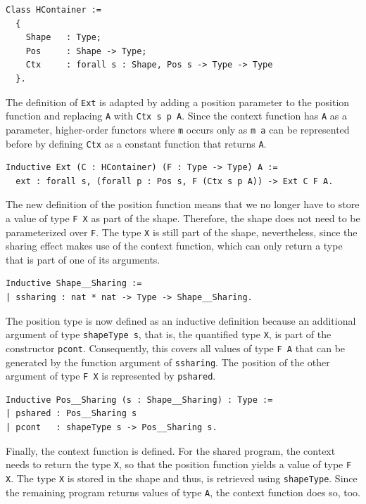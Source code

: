 \documentclass[a4paper, 11pt, fleqn, twoside]{scrreprt}
\newcommand{\hinl}[1]{\texttt{#1}}
\newcommand{\cinl}[1]{\texttt{#1}}
\begin{document}
\begin{verbatim}
Class HContainer :=
  {
    Shape   : Type;
    Pos     : Shape -> Type;
    Ctx     : forall s : Shape, Pos s -> Type -> Type
  }.
\end{verbatim}

The definition of \cinl{Ext} is adapted by adding a position parameter to the position function and replacing \cinl{A} with \cinl{Ctx s p A}.
Since the context function has \cinl{A} as a parameter, higher-order functors where \hinl{m} occurs only as \hinl{m a} can be represented before by defining \cinl{Ctx} as a constant function that returns \cinl{A}.
 
\begin{verbatim}
Inductive Ext (C : HContainer) (F : Type -> Type) A :=
  ext : forall s, (forall p : Pos s, F (Ctx s p A)) -> Ext C F A.
\end{verbatim}

The new definition of the position function means that we no longer have to store a value of type \cinl{F X} as part of the shape.
Therefore, the shape does not need to be parameterized over \cinl{F}.
The type \cinl{X} is still part of the shape, nevertheless, since the sharing effect makes use of the context function, which can only return a type that is part of one of its arguments.

\begin{verbatim}
Inductive Shape__Sharing :=
| ssharing : nat * nat -> Type -> Shape__Sharing.
\end{verbatim}

The position type is now defined as an inductive definition because an additional argument of type \cinl{shapeType s}, that is, the quantified type \cinl{X}, is part of the constructor \cinl{pcont}.
Consequently, this covers all values of type \cinl{F A} that can be generated by the function argument of \cinl{ssharing}.
The position of the other argument of type \cinl{F X} is represented by \cinl{pshared}.

\begin{verbatim}
Inductive Pos__Sharing (s : Shape__Sharing) : Type :=
| pshared : Pos__Sharing s
| pcont   : shapeType s -> Pos__Sharing s.
\end{verbatim}

Finally, the context function is defined.
For the shared program, the context needs to return the type \cinl{X}, so that the position function yields a value of type \cinl{F X}.
The type \cinl{X} is stored in the shape and thus, is retrieved using \cinl{shapeType}.
Since the remaining program returns values of type \cinl{A}, the context function does so, too.
\end{document}
